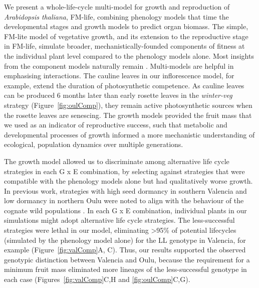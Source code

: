 We present a whole-life-cycle multi-model for growth and reproduction of
\emph{Arabidopsis thaliana}, FM-life, combining phenology models that time the
developmental stages and growth models to predict organ biomass. The simple,
FM-lite model of vegetative growth, and its extension to the reproductive stage
in FM-life, simulate broader, mechanistically-founded components of fitness at
the individual plant level compared to the phenology models alone. Most insights
from the component models naturally remain
\citep{rasse_leaf_2006,christophe_model-based_2008,
  wilczek_effects_2009,burghardt_modeling_2015}. Multi-models are helpful in
emphasising interactions. The cauline leaves in our inflorescence model, for
example, extend the duration of photosynthetic competence. As cauline leaves can
be produced 6 months later than early rosette leaves in the \emph{winter-veg}
strategy (Figure~\ref{fig:oulComp}), they remain active photosynthetic sources
\citep{earley_inflorescences_2009, leonardos_photosynthetic_2014} when the
rosette leaves are senescing. The growth models provided the fruit mass that we
used as an indicator of reproductive success, such that metabolic and
developmental processes of growth informed a more mechanistic understanding of
ecological, population dynamics over multiple generations.

The growth model allowed us to discriminate among alternative life cycle
strategies in each G x E combination, by selecting against strategies that were
compatible with the phenology models alone but had qualitatively worse
growth. In previous work, strategies with high seed dormancy in southern
Valencia and low dormancy in northern Oulu were noted to align with the
behaviour of the cognate wild populations \citep{atwell_genome-wide_2010,
  chiang_dog1_2011, mendez-vigo_altitudinal_2011, burghardt_data_2014}. In each
G x E combination, individual plants in our simulations might adopt alternative
life cycle strategies. The less-successful strategies were lethal in our model,
eliminating \textgreater{}95\% of potential lifecycles (simulated by the
phenology model alone) for the LL genotype in Valencia, for example
(Figure~\ref{fig:valComp}A, C). Thus, our results supported the observed
genotypic distinction between Valencia and Oulu, because the requirement for a
minimum fruit mass eliminated more lineages of the less-successful genotype in
each case (Figures~\ref{fig:valComp}C,H and \ref{fig:oulComp}C,G).


